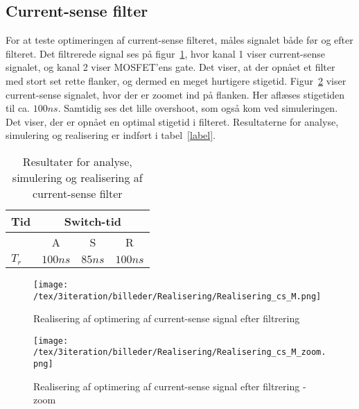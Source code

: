 
\subsection{Current-sense filter}
For at teste optimeringen af current-sense filteret, måles signalet både før og efter filteret. Det filtrerede signal ses på figur~\ref{fig:Realisering_cs_M_3}, hvor kanal 1 viser current-sense signalet, og kanal 2 viser MOSFET'ens gate. Det viser, at der opnået et filter med stort set rette flanker, og dermed en meget hurtigere stigetid. Figur~\ref{fig:Realisering_cs_M_zoom_3} viser current-sense signalet, hvor der er zoomet ind på flanken. Her aflæses stigetiden til ca. $100ns$. Samtidig ses det lille overshoot, som også kom ved simuleringen. Det viser, der er opnået en optimal stigetid i filteret. Resultaterne for analyse, simulering og realisering er indført i tabel~\ref{label}.

\begin{table}[H] 			
	\centering
	\begin{tabularx}{\textwidth}{|X|c|c|c|}
		\hline
		\textbf{Tid} & \multicolumn{3}{|c|}{\textbf{Switch-tid}} 										\\ \hline
		& A & S & R 									\\ \hline
		$T_{r}$ & $100ns$ & $85ns$ & $100ns$ 										\\ \hline 
	\end{tabularx}
	\caption{Resultater for analyse, simulering og realisering af current-sense filter}
	\label{tab:resultat_cs_filter_3}
\end{table}


\begin{figure}[H]
	\center
	\texttt{[image: /tex/3iteration/billeder/Realisering/Realisering\_cs\_M.png]}
	\caption{Realisering af optimering af current-sense signal efter filtrering}
	\label{fig:Realisering_cs_M_3}
\end{figure}

\begin{figure}[H]
	\center
	\texttt{[image: /tex/3iteration/billeder/Realisering/Realisering\_cs\_M\_zoom.png]}
	\caption{Realisering af optimering af current-sense signal efter filtrering - zoom}
	\label{fig:Realisering_cs_M_zoom_3}
\end{figure}